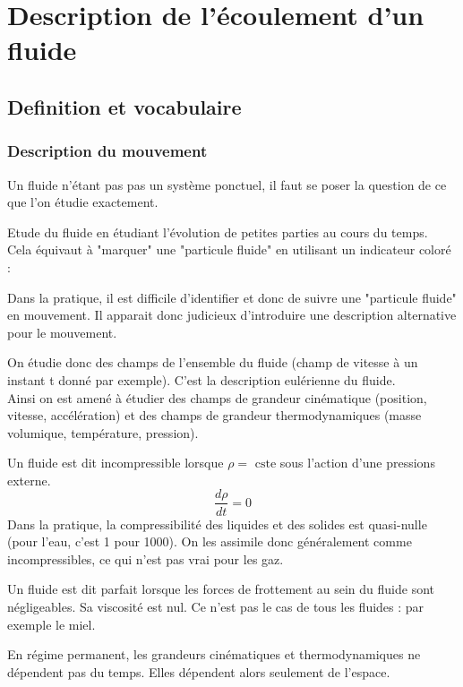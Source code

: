 \section{Description de l'écoulement d'un fluide}
\subsection{Definition et vocabulaire}
\subsubsection{Description du mouvement}

Un fluide n'étant pas pas un système ponctuel, il faut se poser la question de ce que l'on étudie exactement.\\
\begin{definition}\label{def:desclag}
    Etude du fluide en étudiant l'évolution de petites parties au cours du temps.\\
    Cela équivaut à "marquer" une "particule fluide" en utilisant un indicateur coloré : 
\end{definition}

\begin{remark}[pratique]
    Dans la pratique, il est difficile d'identifier et donc de suivre une "particule fluide" en mouvement. Il apparait donc judicieux d'introduire une description alternative pour le mouvement. 
\end{remark}

\begin{definition}\label{def:desceul}
    On étudie donc des champs de l'ensemble du fluide (champ de vitesse à un instant t donné par exemple). C'est la description eulérienne du fluide.\\ 
    Ainsi on est amené à étudier des champs de grandeur cinématique (position, vitesse, accélération) et des champs de grandeur thermodynamiques (masse volumique, température, pression).
\end{definition}
\begin{definition}\label{def:incompressible}
    Un fluide est dit incompressible lorsque \(\rho  = \text{ cste }\)sous l'action d'une pressions externe.
    \[
        \frac{d \rho }{dt} = 0
    \]
    Dans la pratique, la compressibilité des liquides et des solides est quasi-nulle (pour l'eau, c'est 1 pour 1000). On les assimile donc généralement comme incompressibles, ce qui n'est pas vrai pour les gaz.
\end{definition}

\begin{definition}\label{def:fparf}
    Un fluide est dit parfait lorsque les forces de frottement au sein du fluide sont négligeables. Sa viscosité est nul. Ce n'est pas le cas de tous les fluides : par exemple le miel.
\end{definition}

\begin{definition}\label{def:ecoulperm}
    En régime permanent, les grandeurs cinématiques et thermodynamiques ne dépendent pas du temps. Elles dépendent alors seulement de l'espace.
\end{definition}